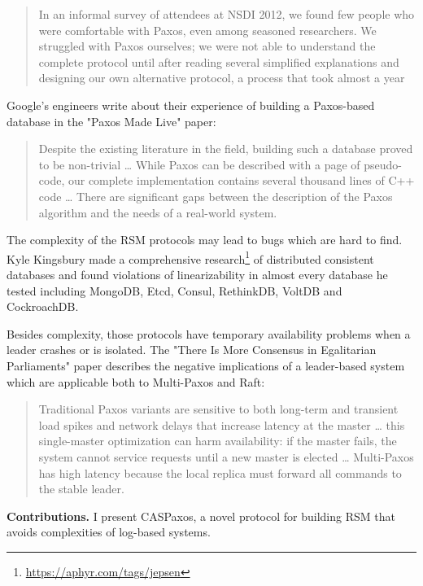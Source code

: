 \documentclass[12pt]{article}
\theoremstyle{definition}
\begin{document}
\begin{quote}
In an informal survey of attendees at NSDI 2012, we found few people who were comfortable with Paxos, even among seasoned researchers. We struggled with Paxos ourselves; we were not able to understand the complete protocol until after reading several simplified explanations and designing our own alternative protocol, a process that took almost a year
\end{quote}

Google's engineers write about their experience of building a Paxos-based database in the "Paxos Made Live"\cite{chubby} paper:

\begin{quote}
Despite the existing literature in the field, building such a database proved to be non-trivial \ldots{} While Paxos can be described with a page of pseudo-code, our complete implementation contains several thousand lines of C++ code \ldots{} There are significant gaps between the description of the Paxos algorithm and the needs of a real-world system.
\end{quote}

The complexity of the RSM protocols may lead to bugs which are hard to find. Kyle Kingsbury made a comprehensive research\footnote{\href{https://aphyr.com/tags/jepsen}{https://aphyr.com/tags/jepsen}} of distributed consistent databases and found violations of linearizability in almost every database he tested including MongoDB, Etcd, Consul, RethinkDB, VoltDB and CockroachDB.

Besides complexity, those protocols have temporary availability problems when a leader crashes or is isolated. The "There Is More Consensus in Egalitarian Parliaments" paper\cite{epaxos} describes the negative implications of a leader-based system which are applicable both to Multi-Paxos and Raft:

\begin{quote}
Traditional Paxos variants are sensitive to both long-term and transient load spikes and network delays that increase latency at the master \ldots{} this single-master optimization can harm availability: if the master fails, the system cannot service requests until a new master is elected \ldots{} Multi-Paxos has high latency because the local replica must forward all commands to the stable leader.
\end{quote}

{\bf Contributions.} I present CASPaxos, a novel protocol for building RSM that avoids complexities of log-based systems.
\end{document}
